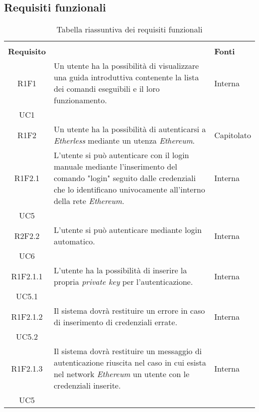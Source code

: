 \subsection{Requisiti funzionali}

\renewcommand{\arraystretch}{2.2}

\begin{longtable}{|c|p{8cm}|C{2cm}|}

	\caption{Tabella riassuntiva dei requisiti funzionali}\\


	\textbf{Requisito} &  & \textbf{Fonti}\\

	\endfirsthead

	R1F1 & Un utente ha la possibilità di visualizzare una guida introduttiva contenente la lista dei comandi eseguibili e il loro funzionamento. &  \centering Interna \\ UC1 \tabularnewline

	R1F2 & Un utente ha la possibilità di autenticarsi a \textit{Etherless} mediante un utenza \textit{Ethereum\glos}. & Capitolato \\

	R1F2.1 & L'utente si può autenticare con il login manuale mediante l'inserimento del comando "login" seguito dalle credenziali che lo identificano univocamente all'interno della rete \textit{Ethereum\glos}.  & \centering Interna \\ UC5 \tabularnewline

	R2F2.2 & L'utente si può autenticare mediante login automatico. & \centering Interna \\ UC6 \tabularnewline


	R1F2.1.1 &  L'utente ha la possibilità di inserire la propria \textit{private key\glo} per l'autenticazione. & \centering Interna \\ UC5.1 \tabularnewline

	R1F2.1.2 &  Il sistema dovrà restituire un errore in caso di inserimento di credenziali errate. & \centering Interna \\ UC5.2 \tabularnewline

	R1F2.1.3 &  Il sistema dovrà restituire un messaggio di autenticazione riuscita nel caso in cui esista nel network \textit{Ethereum\glo} un utente con le credenziali inserite. & \centering Interna \\ UC5 \tabularnewline


\end{longtable}
